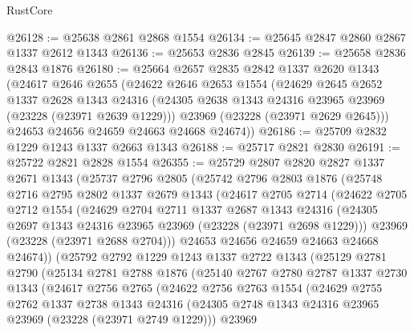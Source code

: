 \begin{lexlean}{RustCore}
\begin{coremodule}
@26128 := @25638 @2861 @2868 @1554
@26134 := @25645 @2847 @2860 @2867 @1337 @2612 @1343
@26136 := @25653 @2836 @2845
@26139 := @25658 @2836 @2843 @1876
@26180 := @25664
    @2657
    @2835
    @2842
    @1337
    @2620
    @1343
    (@24617
      @2646
      @2655
      (@24622
        @2646
        @2653
        @1554
        (@24629
          @2645
          @2652
          @1337
          @2628
          @1343
          @24316
          (@24305 @2638 @1343 @24316 @23965 @23969 (@23228 (@23971 @2639 @1229)))
          @23969
          (@23228 (@23971 @2629 @2645)))
        @24653
        @24656
        @24659
        @24663
        @24668
        @24674))
@26186 := @25709 @2832 @1229 @1243 @1337 @2663 @1343
@26188 := @25717 @2821 @2830
@26191 := @25722 @2821 @2828 @1554
@26355 := @25729
    @2807
    @2820
    @2827
    @1337
    @2671
    @1343
    (@25737
      @2796
      @2805
      (@25742
        @2796
        @2803
        @1876
        (@25748
          @2716
          @2795
          @2802
          @1337
          @2679
          @1343
          (@24617
            @2705
            @2714
            (@24622
              @2705
              @2712
              @1554
              (@24629
                @2704
                @2711
                @1337
                @2687
                @1343
                @24316
                (@24305 @2697 @1343 @24316 @23965 @23969 (@23228 (@23971 @2698 @1229)))
                @23969
                (@23228 (@23971 @2688 @2704)))
              @24653
              @24656
              @24659
              @24663
              @24668
              @24674))
          (@25792
            @2792
            @1229
            @1243
            @1337
            @2722
            @1343
            (@25129
              @2781
              @2790
              (@25134
                @2781
                @2788
                @1876
                (@25140
                  @2767
                  @2780
                  @2787
                  @1337
                  @2730
                  @1343
                  (@24617
                    @2756
                    @2765
                    (@24622
                      @2756
                      @2763
                      @1554
                      (@24629
                        @2755
                        @2762
                        @1337
                        @2738
                        @1343
                        @24316
                        (@24305 @2748 @1343 @24316 @23965 @23969 (@23228 (@23971 @2749 @1229)))
                        @23969

\end{coremodule}
\end{lexlean}
